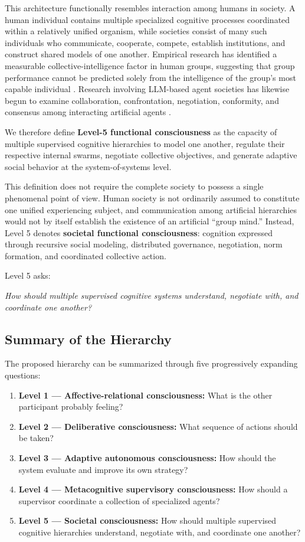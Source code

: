 This architecture functionally resembles interaction among humans in society. A human individual contains multiple specialized cognitive processes coordinated within a relatively unified organism, while societies consist of many such individuals who communicate, cooperate, compete, establish institutions, and construct shared models of one another. Empirical research has identified a measurable collective-intelligence factor in human groups, suggesting that group performance cannot be predicted solely from the intelligence of the group’s most capable individual \cite{woolley2010collective}. Research involving LLM-based agent societies has likewise begun to examine collaboration, confrontation, negotiation, conformity, and consensus among interacting artificial agents \cite{zhang2023collaboration,lan2023society}.

We therefore define \textbf{Level-5 functional consciousness} as the capacity of multiple supervised cognitive hierarchies to model one another, regulate their respective internal swarms, negotiate collective objectives, and generate adaptive social behavior at the system-of-systems level.

This definition does not require the complete society to possess a single phenomenal point of view. Human society is not ordinarily assumed to constitute one unified experiencing subject, and communication among artificial hierarchies would not by itself establish the existence of an artificial “group mind.” Instead, Level 5 denotes \textbf{societal functional consciousness}: cognition expressed through recursive social modeling, distributed governance, negotiation, norm formation, and coordinated collective action.

Level 5 asks:

\textit{How should multiple supervised cognitive systems understand, negotiate with, and coordinate one another?}

\subsection{Summary of the Hierarchy}

The proposed hierarchy can be summarized through five progressively expanding questions:

\begin{enumerate}
\item \textbf{Level 1 — Affective-relational consciousness:} What is the other participant probably feeling?
\item \textbf{Level 2 — Deliberative consciousness:} What sequence of actions should be taken?
\item \textbf{Level 3 — Adaptive autonomous consciousness:} How should the system evaluate and improve its own strategy?
\item \textbf{Level 4 — Metacognitive supervisory consciousness:} How should a supervisor coordinate a collection of specialized agents?
\item \textbf{Level 5 — Societal consciousness:} How should multiple supervised cognitive hierarchies understand, negotiate with, and coordinate one another?
\end{enumerate}

